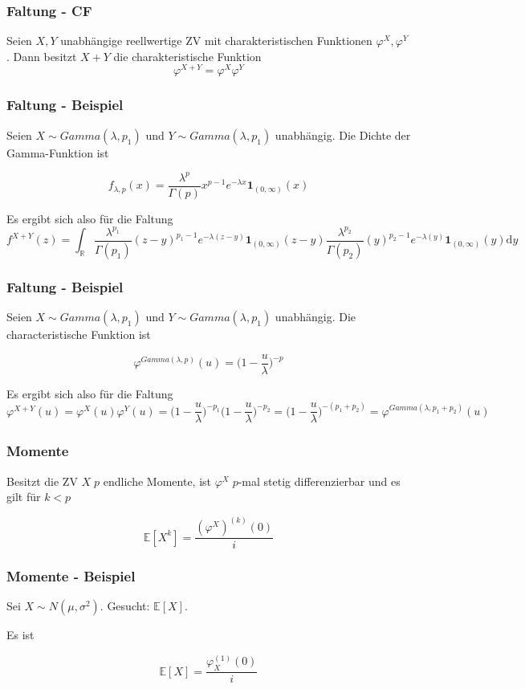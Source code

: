 \documentclass{beamer}
\newcommand{\R}{\mathbb{R}}
\newcommand{\E}{\mathbb{E}}
\newcommand\dint{\mathord{\mathrm{d}}}
\begin{document}
\begin{frame}
\frametitle{Faltung - CF}
  Seien $X, Y$ unabhängige reellwertige ZV mit charakteristischen Funktionen $\varphi^X, \varphi^Y$. Dann besitzt $X + Y$ die charakteristische Funktion
$$\varphi^{X+Y} = \varphi^X \varphi^Y$$
\end{frame}

\begin{frame}
\frametitle{Faltung - Beispiel}
Seien $X \sim Gamma(\lambda, p_1)$ und $Y \sim Gamma(\lambda, p_1)$ unabhängig. Die Dichte der Gamma-Funktion ist

$$f_{\lambda, p}(x) = \frac{\lambda^p}{\Gamma(p)} x^{p-1} e^{-\lambda x} \mathbf{1}_{(0, \infty)} (x)$$

Es ergibt sich also für die Faltung
{\scriptsize
$$f^{X+Y}(z) = \int_\R \frac{\lambda^{p_1}}{\Gamma(p_1)} (z-y)^{p_1-1} e^{-\lambda (z-y)} \mathbf{1}_{(0, \infty)} (z-y) \frac{\lambda^{p_2}}{\Gamma(p_2)} (y)^{p_2-1} e^{-\lambda (y)} \mathbf{1}_{(0, \infty)} (y) \dint y$$
}%
\end{frame}

\begin{frame}
\frametitle{Faltung - Beispiel}
Seien $X \sim Gamma(\lambda, p_1)$ und $Y \sim Gamma(\lambda, p_1)$ unabhängig. Die characteristische Funktion ist

$$\varphi^{Gamma(\lambda, p)}(u) = \Bigg(1-\frac{u}{\lambda}\Bigg)^{-p}$$

Es ergibt sich also für die Faltung
{\tiny
$$\varphi^{X+Y}(u) = \varphi^{X}(u)\varphi^{Y}(u) = \Bigg(1-\frac{u}{\lambda}\Bigg)^{-p_1} \Bigg(1-\frac{u}{\lambda}\Bigg)^{-p_2} = \Bigg(1-\frac{u}{\lambda}\Bigg)^{-(p_1+p_2)} = \varphi^{Gamma(\lambda, p_1 + p_2)}(u)$$
}%
\end{frame}

\begin{frame}
\frametitle{Momente}
Besitzt die ZV $X \; p$ endliche Momente, ist $\varphi^X \; p$-mal stetig differenzierbar und es gilt für $k < p$

\begin{equation*}
\E[X^k] = \frac{(\varphi^X)^{(k)}(0)}{i}
\end{equation*}
\end{frame}

\begin{frame}
\frametitle{Momente - Beispiel}
Sei $X \sim N(\mu, \sigma^2)$. Gesucht: $\E[X]$.

Es ist

$$\E[X] = \frac{\varphi_X^{(1)}(0)}{i}$$
\end{frame}
\end{document}

